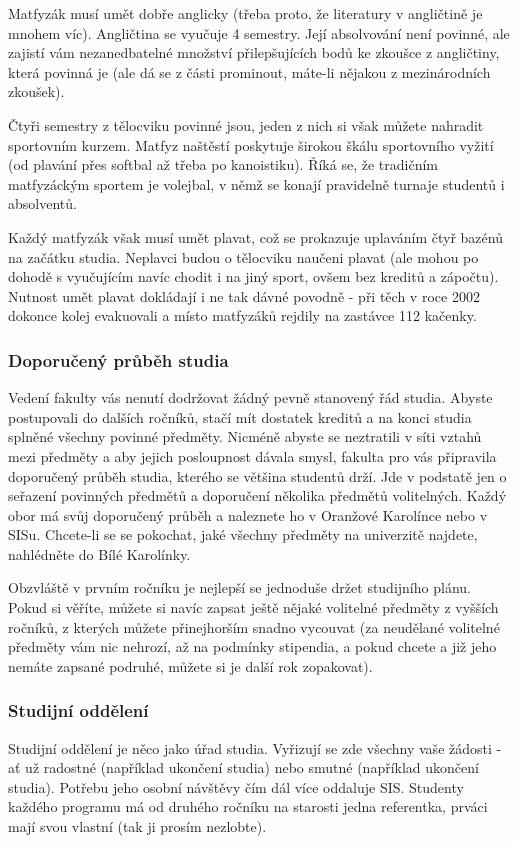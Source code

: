 Matfyzák musí umět dobře anglicky (třeba proto, že literatury v angličtině je mnohem víc). Angličtina se vyučuje 4 semestry. Její absolvování není povinné, ale zajistí vám nezanedbatelné množství přilepšujících bodů ke zkoušce z angličtiny, která povinná je (ale dá se z části prominout, máte-li nějakou z mezinárodních zkoušek).

Čtyři semestry z tělocviku povinné jsou, jeden z nich si však můžete nahradit sportovním kurzem. Matfyz naštěstí poskytuje širokou škálu sportovního vyžití (od plavání přes softbal až třeba po kanoistiku). Říká se, že tradičním matfyzáckým sportem je volejbal, v němž se konají pravidelně turnaje studentů i absolventů.

Každý matfyzák však musí umět plavat, což se prokazuje uplaváním čtyř bazénů na začátku studia. Neplavci budou o tělocviku naučeni plavat (ale mohou po dohodě s vyučujícím navíc chodit i na jiný sport, ovšem bez kreditů a zápočtu). Nutnost umět plavat dokládají i ne tak dávné povodně - při těch v roce 2002 dokonce kolej evakuovali a místo matfyzáků rejdily na zastávce 112 kačenky.


\subsubsection{Doporučený průběh studia}
Vedení fakulty vás nenutí dodržovat žádný pevně stanovený řád studia. Abyste postupovali do dalších ročníků, stačí mít dostatek kreditů a na konci studia splněné všechny povinné předměty. Nicméně abyste se neztratili v síti vztahů mezi předměty a aby jejich posloupnost dávala smysl, fakulta pro vás připravila doporučený průběh studia, kterého se většina studentů drží. Jde v podstatě jen o seřazení povinných předmětů a doporučení několika předmětů volitelných. Každý obor má svůj doporučený průběh a naleznete ho v Oranžové Karolínce nebo v SISu. Chcete-li se se pokochat, jaké všechny předměty na univerzitě najdete, nahlédněte do Bílé Karolínky.

Obzvláště v prvním ročníku je nejlepší se jednoduše držet studijního plánu. Pokud si věříte, můžete si navíc zapsat ještě nějaké volitelné předměty z vyšších ročníků, z kterých můžete přinejhorším snadno vycouvat (za neudělané volitelné předměty vám nic nehrozí, až na podmínky stipendia, a pokud chcete a již jeho nemáte zapsané podruhé, můžete si je další rok zopakovat).


\subsubsection{Studijní oddělení}
Studijní oddělení je něco jako úřad studia. Vyřizují se zde všechny vaše žádosti - ať už radostné (například ukončení studia) nebo smutné (například ukončení studia). Potřebu jeho osobní návštěvy čím dál více oddaluje SIS. Studenty každého programu má od druhého ročníku na starosti jedna referentka, prváci mají svou vlastní (tak ji prosím nezlobte).

